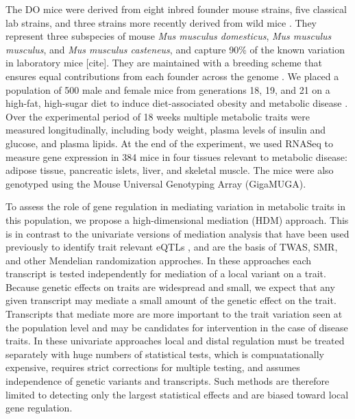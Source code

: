 \documentclass[
]{article}
\begin{document}
The DO mice were derived from eight inbred founder mouse strains, five
classical lab strains, and three strains more recently derived from wild
mice \cite{pmid22892839}. They represent three subspecies of mouse
\textit{Mus musculus domesticus}, \textit{Mus musculus musculus}, and
\textit{Mus musculus casteneus}, and capture 90\% of the known variation
in laboratory mice {[}cite{]}. They are maintained with a breeding
scheme that ensures equal contributions from each founder across the
genome \cite{pmid22892839}. We placed a population of 500 male and
female mice from generations 18, 19, and 21 on a high-fat, high-sugar
diet to induce diet-associated obesity and metabolic disease
\cite{pmid29567659}. Over the experimental period of 18 weeks multiple
metabolic traits were measured longitudinally, including body weight,
plasma levels of insulin and glucose, and plasma lipids. At the end of
the experiment, we used RNASeq to measure gene expression in 384 mice in
four tissues relevant to metabolic disease: adipose tissue, pancreatic
islets, liver, and skeletal muscle. The mice were also genotyped using
the Mouse Universal Genotyping Array (GigaMUGA).

To assess the role of gene regulation in mediating variation in
metabolic traits in this population, we propose a high-dimensional
mediation (HDM) approach. This is in contrast to the univariate versions
of mediation analysis \cite{pmid16968208} that have been used previously
to identify trait relevant eQTLs
\cite{pmid29567659, pmid35533209, pmid27309819, 
pmid30950127}, and are the basis of TWAS, SMR, and other Mendelian
randomization approches. In these approaches each transcript is tested
independently for mediation of a local variant on a trait. Because
genetic effects on traits are widespread and small, we expect that any
given transcript may mediate a small amount of the genetic effect on the
trait. Transcripts that mediate more are more important to the trait
variation seen at the population level and may be candidates for
intervention in the case of disease traits. In these univariate
approaches local and distal regulation must be treated separately with
huge numbers of statistical tests, which is compuatationally expensive,
requires strict corrections for multiple testing, and assumes
independence of genetic variants and transcripts. Such methods are
therefore limited to detecting only the largest statistical effects and
are biased toward local gene regulation.
\end{document}
